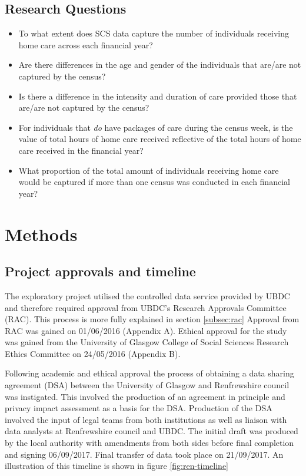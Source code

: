 \documentclass[]{article}
\begin{document}

\FloatBarrier
\subsection{Research Questions}\label{subsec:renfrew-qs}

\begin{itemize}[noitemsep]
\item To what extent does SCS data capture the number of individuals receiving home care across each financial year?
\item Are there differences in the age and gender of the individuals that are/are not captured by the census?
\item Is there a difference in the intensity and duration of care provided those that are/are not captured by the census?
\item For individuals that \emph{do} have packages of care during the census week, is the value of total hours of home care received reflective of the total hours of home care received in the financial year?
\item What proportion of the total amount of individuals receiving home care would be captured if more than one census was conducted in each financial year?
\end{itemize}

\section{Methods}\label{sec:renf-methods}

\subsection{Project approvals and timeline}\label{subsec:renf-methods-approvals}

The exploratory project utilised the controlled data service provided by
UBDC and therefore required approval from UBDC's Research Approvals
Committee (RAC). This process is more fully explained in section
\ref{subsec:rac} Approval from RAC was gained on 01/06/2016 (Appendix
A). Ethical approval for the study was gained from the University of
Glasgow College of Social Sciences Research Ethics Committee on
24/05/2016 (Appendix B).

Following academic and ethical approval the process of obtaining a data
sharing agreement (DSA) between the University of Glasgow and
Renfrewshire council was instigated. This involved the production of an
agreement in principle and privacy impact assessment as a basis for the
DSA. Production of the DSA involved the input of legal teams from both
institutions as well as liaison with data analysts at Renfrewshire
council and UBDC. The initial draft was produced by the local authority
with amendments from both sides before final completion and signing
06/09/2017. Final transfer of data took place on 21/09/2017. An
illustration of this timeline is shown in figure \ref{fig:ren-timeline}
\end{document}

